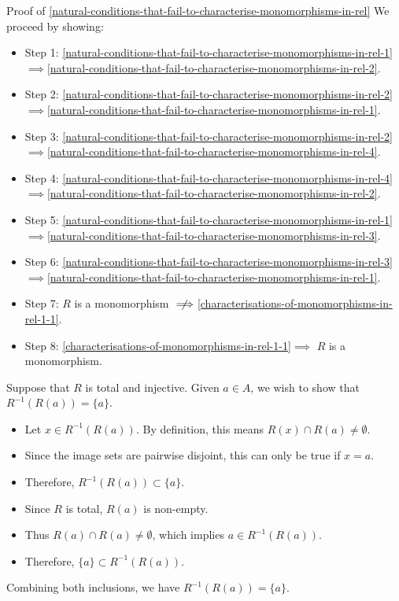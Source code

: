 \begin{Proof}{Proof of \cref{natural-conditions-that-fail-to-characterise-monomorphisms-in-rel}}%
    We proceed by showing:
    \begin{itemize}
        \item Step 1: \cref{natural-conditions-that-fail-to-characterise-monomorphisms-in-rel-1}$\implies$\cref{natural-conditions-that-fail-to-characterise-monomorphisms-in-rel-2}.
        \item Step 2: \cref{natural-conditions-that-fail-to-characterise-monomorphisms-in-rel-2}$\implies$\cref{natural-conditions-that-fail-to-characterise-monomorphisms-in-rel-1}.
        \item Step 3: \cref{natural-conditions-that-fail-to-characterise-monomorphisms-in-rel-2}$\implies$\cref{natural-conditions-that-fail-to-characterise-monomorphisms-in-rel-4}.
        \item Step 4: \cref{natural-conditions-that-fail-to-characterise-monomorphisms-in-rel-4}$\implies$\cref{natural-conditions-that-fail-to-characterise-monomorphisms-in-rel-2}.
        \item Step 5: \cref{natural-conditions-that-fail-to-characterise-monomorphisms-in-rel-1}$\implies$\cref{natural-conditions-that-fail-to-characterise-monomorphisms-in-rel-3}.
        \item Step 6: \cref{natural-conditions-that-fail-to-characterise-monomorphisms-in-rel-3}$\implies$\cref{natural-conditions-that-fail-to-characterise-monomorphisms-in-rel-1}.
        \item Step 7: $R$ is a monomorphism $\centernot{\implies}$\cref{characterisations-of-monomorphisms-in-rel-1-1}.%
        \item Step 8: \cref{characterisations-of-monomorphisms-in-rel-1-1}$\implies$ $R$ is a monomorphism.%
    \end{itemize}

    Suppose that $R$ is total and injective. Given $a\in A$, we wish to show that $R^{-1}(R(a))=\{a\}$.
    \begin{itemize}
        \item Let $x\in R^{-1}(R(a))$. By definition, this means $R(x)\cap R(a)\neq\emptyset$.
        \item Since the image sets are pairwise disjoint, this can only be true if $x=a$.
        \item Therefore, $R^{-1}(R(a))\subset\{a\}$.
        \item Since $R$ is total, $R(a)$ is non-empty.
        \item Thus $R(a)\cap R(a)\neq\emptyset$, which implies $a\in R^{-1}(R(a))$.
        \item Therefore, $\{a\}\subset R^{-1}(R(a))$.
    \end{itemize}
    Combining both inclusions, we have $R^{-1}(R(a))=\{a\}$.


\end{Proof}
